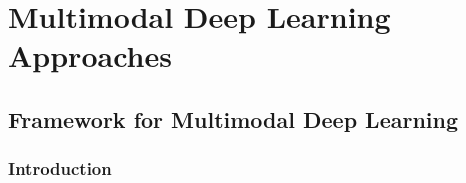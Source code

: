 
\part{Multimodal Deep Learning Approaches}
\label{part:multimodal-deep}

\chapter{Framework for Multimodal Deep Learning}
\label{sec:deep-learning}

\section{Introduction}
\label{sec:deep-learning:introduction}
